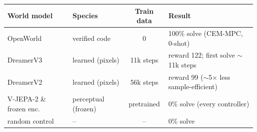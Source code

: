 \begin{tabular}{llcl}
\toprule
World model & Species & Train data & Result \\
\midrule
OpenWorld & verified code & 0 & 100\% solve (CEM-MPC, 0-shot) \\
DreamerV3 & learned (pixels) & 11k steps & reward 122; first solve $\sim$11k steps \\
DreamerV2 & learned (pixels) & 56k steps & reward 99 ($\sim$5$\times$ less sample-efficient) \\
V-JEPA-2 \& frozen enc. & perceptual (frozen) & pretrained & 0\% solve (every controller) \\
random control & -- & -- & 0\% solve \\
\bottomrule
\end{tabular}
